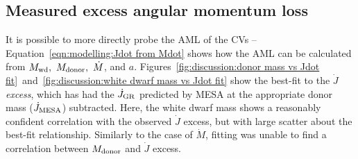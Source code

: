 \subsection{Measured excess angular momentum loss}

It is possible to more directly probe the AML of the CVs -- Equation~\ref{eqn:modelling:Jdot from Mdot} shows how the AML can be calculated from $M_{\rm wd},\ M_{\rm donor},\ \dot M$, and $a$.
Figures~\ref{fig:discussion:donor mass vs Jdot fit}~and~\ref{fig:discussion:white dwarf mass vs Jdot fit} show the best-fit to the $\dot J$ \textit{excess}, which has had the $\dot J_{\rm GR}$ predicted by MESA at the appropriate donor mass ($\dot J_{\rm MESA}$) subtracted.
Here, the white dwarf mass shows a reasonably confident correlation with the observed $\dot J$ excess, but with large scatter about the best-fit relationship. Similarly to the case of $\dot M$, fitting was unable to find a correlation between $M_{\rm donor}$ and $\dot J$ excess.

